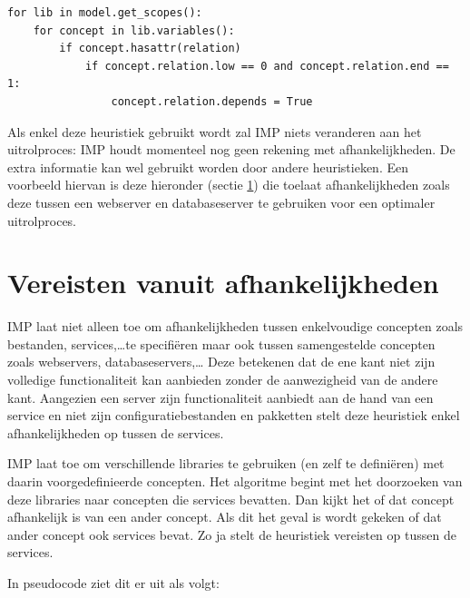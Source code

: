 \begin{minipage}{\textwidth}
\begin{lstlisting}
for lib in model.get_scopes():
    for concept in lib.variables():
        if concept.hasattr(relation)
            if concept.relation.low == 0 and concept.relation.end == 1:
                concept.relation.depends = True
\end{lstlisting}
\end{minipage}

Als enkel deze heuristiek gebruikt wordt zal IMP niets veranderen aan het uitrolproces: IMP houdt momenteel nog geen rekening met afhankelijkheden.
De extra informatie kan wel gebruikt worden door andere heuristieken.
Een voorbeeld hiervan is deze hieronder (sectie \ref{sec:vereisten_uit_afhankelijkheden}) die toelaat afhankelijkheden zoals deze tussen een webserver en databaseserver te gebruiken voor een optimaler uitrolproces.

\section{Vereisten vanuit afhankelijkheden}
\label{sec:vereisten_uit_afhankelijkheden}
IMP laat niet alleen toe om afhankelijkheden tussen enkelvoudige concepten zoals bestanden, services,\ldots te specifi\"eren maar ook tussen samengestelde concepten zoals webservers, databaseservers,\ldots
Deze betekenen dat de ene kant niet zijn volledige functionaliteit kan aanbieden zonder de aanwezigheid van de andere kant.
Aangezien een server zijn functionaliteit aanbiedt aan de hand van een service en niet zijn configuratiebestanden en pakketten stelt deze heuristiek enkel afhankelijkheden op tussen de services.

IMP laat toe om verschillende libraries te gebruiken (en zelf te defini\"eren) met daarin voorgedefinieerde concepten. 
Het algoritme begint met het doorzoeken van deze libraries naar concepten die services bevatten.
Dan kijkt het of dat concept afhankelijk is van een ander concept.
Als dit het geval is wordt gekeken of dat ander concept ook services bevat.
Zo ja stelt de heuristiek vereisten op tussen de services. 

In pseudocode ziet dit er uit als volgt:

